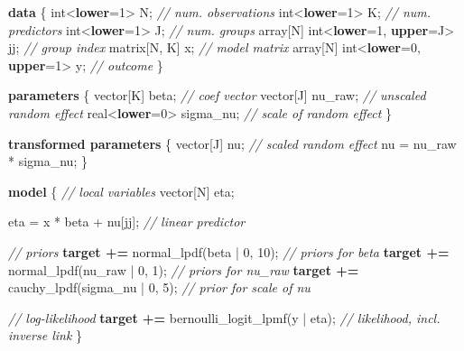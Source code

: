 \documentclass[
  11pt,
]{article}
\newenvironment{Shaded}{\begin{snugshade}}{\end{snugshade}}
\newcommand{\CommentTok}[1]{\textcolor[rgb]{0.56,0.35,0.01}{\textit{#1}}}
\newcommand{\DataTypeTok}[1]{\textcolor[rgb]{0.13,0.29,0.53}{#1}}
\newcommand{\DecValTok}[1]{\textcolor[rgb]{0.00,0.00,0.81}{#1}}
\newcommand{\KeywordTok}[1]{\textcolor[rgb]{0.13,0.29,0.53}{\textbf{#1}}}
\newcommand{\NormalTok}[1]{#1}
\begin{document}
\begin{Shaded}
\begin{Highlighting}[]
\KeywordTok{data}\NormalTok{ \{}
  \DataTypeTok{int}\NormalTok{\textless{}}\KeywordTok{lower}\NormalTok{=}\DecValTok{1}\NormalTok{\textgreater{} N;                    }\CommentTok{// num. observations}
  \DataTypeTok{int}\NormalTok{\textless{}}\KeywordTok{lower}\NormalTok{=}\DecValTok{1}\NormalTok{\textgreater{} K;                    }\CommentTok{// num. predictors}
  \DataTypeTok{int}\NormalTok{\textless{}}\KeywordTok{lower}\NormalTok{=}\DecValTok{1}\NormalTok{\textgreater{} J;                    }\CommentTok{// num. groups}
  \DataTypeTok{array}\NormalTok{[N] }\DataTypeTok{int}\NormalTok{\textless{}}\KeywordTok{lower}\NormalTok{=}\DecValTok{1}\NormalTok{, }\KeywordTok{upper}\NormalTok{=J\textgreater{} jj; }\CommentTok{// group index}
  \DataTypeTok{matrix}\NormalTok{[N, K] x;                    }\CommentTok{// model matrix}
  \DataTypeTok{array}\NormalTok{[N] }\DataTypeTok{int}\NormalTok{\textless{}}\KeywordTok{lower}\NormalTok{=}\DecValTok{0}\NormalTok{, }\KeywordTok{upper}\NormalTok{=}\DecValTok{1}\NormalTok{\textgreater{} y;  }\CommentTok{// outcome}
\NormalTok{\}}

\KeywordTok{parameters}\NormalTok{ \{}
  \DataTypeTok{vector}\NormalTok{[K] beta;          }\CommentTok{// coef vector}
  \DataTypeTok{vector}\NormalTok{[J] nu\_raw;        }\CommentTok{// unscaled random effect}
  \DataTypeTok{real}\NormalTok{\textless{}}\KeywordTok{lower}\NormalTok{=}\DecValTok{0}\NormalTok{\textgreater{} sigma\_nu;  }\CommentTok{// scale of random effect}
\NormalTok{\}}

\KeywordTok{transformed parameters}\NormalTok{ \{}
  \DataTypeTok{vector}\NormalTok{[J] nu;            }\CommentTok{// scaled random effect}
\NormalTok{  nu = nu\_raw * sigma\_nu;}
\NormalTok{\}}

\KeywordTok{model}\NormalTok{ \{}
  \CommentTok{// local variables}
  \DataTypeTok{vector}\NormalTok{[N] eta;}
  
\NormalTok{  eta = x * beta + nu[jj];                  }\CommentTok{// linear predictor}

  \CommentTok{// priors}
  \KeywordTok{target +=}\NormalTok{ normal\_lpdf(beta | }\DecValTok{0}\NormalTok{, }\DecValTok{10}\NormalTok{);      }\CommentTok{// priors for beta}
  \KeywordTok{target +=}\NormalTok{ normal\_lpdf(nu\_raw | }\DecValTok{0}\NormalTok{, }\DecValTok{1}\NormalTok{);     }\CommentTok{// priors for nu\_raw}
  \KeywordTok{target +=}\NormalTok{ cauchy\_lpdf(sigma\_nu | }\DecValTok{0}\NormalTok{, }\DecValTok{5}\NormalTok{);   }\CommentTok{// prior for scale of nu}

  \CommentTok{// log{-}likelihood}
  \KeywordTok{target +=}\NormalTok{ bernoulli\_logit\_lpmf(y | eta); }\CommentTok{// likelihood, incl. inverse link}
\NormalTok{\}}
\end{Highlighting}
\end{Shaded}
\end{document}
